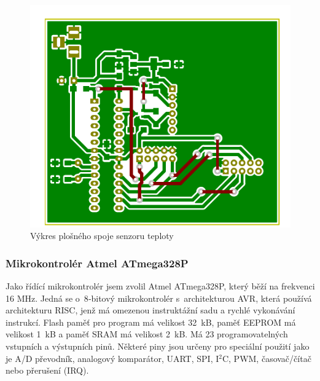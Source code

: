 \documentclass[12pt,a4paper]{article}
\begin{document}
\begin{figure}[H]
\centering
\label{fig:board/sensor}
\includegraphics{../img/kicad/sensor-board.pdf}
\caption{Výkres plošného spoje senzoru teploty}
\end{figure}

\newpage

\subsubsection{Mikrokontrolér Atmel ATmega328P}

Jako řídící mikrokontrolér jsem zvolil Atmel ATmega328P, který běží na frekvenci 16 MHz. Jedná se o~8‑bitový mikrokontrolér s~architekturou AVR, která používá architekturu RISC, jenž má omezenou instruktážní sadu a rychlé vykonávání instrukcí. Flash paměť pro program má velikost 32~kB, paměť EEPROM má velikost 1~kB a paměť SRAM má velikost 2~kB. Má 23 programovatelných vstupních a výstupních pinů. Některé piny jsou určeny pro speciální použití jako je A/D převodník, analogový komparátor, UART, SPI, I$^{2}$C, PWM, časovač/čítač nebo přerušení (IRQ).
\end{document}
